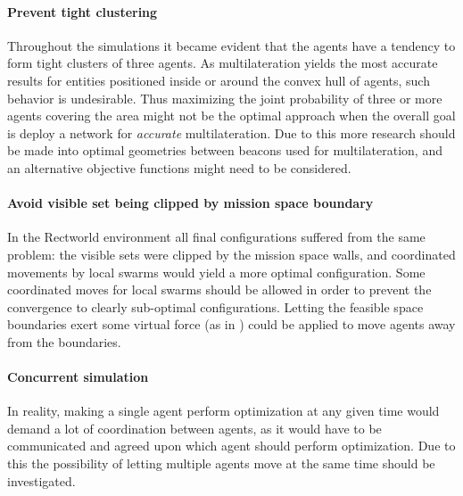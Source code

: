 \paragraph{Prevent tight clustering}
Throughout the simulations it became evident that the agents have a tendency to form tight clusters of three agents.
As multilateration yields the most accurate results for entities positioned inside or around the convex hull of agents,
such behavior is undesirable. Thus maximizing the joint probability of three or more agents covering the area might not be the 
optimal approach when the overall goal is deploy a network for \emph{accurate} multilateration. Due to this more research should be made into
optimal geometries between beacons used for multilateration, and an alternative objective functions might need to be considered.

\paragraph{Avoid visible set being clipped by mission space boundary}
In the Rectworld environment all final configurations suffered from the same problem: the visible sets were clipped by the mission
space walls, and coordinated movements by local swarms would yield a more optimal configuration. 
Some coordinated moves for local swarms should be allowed in order to prevent the convergence to 
clearly sub-optimal configurations. Letting the feasible space boundaries exert some virtual force (as in \cite{pot_field}) could be 
applied to move agents away from the boundaries.

\paragraph{Concurrent simulation} In reality, making a single agent perform optimization at any given time would demand
a lot of coordination between agents, as it would have to be communicated and agreed upon which agent should perform optimization.
Due to this the possibility of letting multiple agents move at the same time should be investigated.